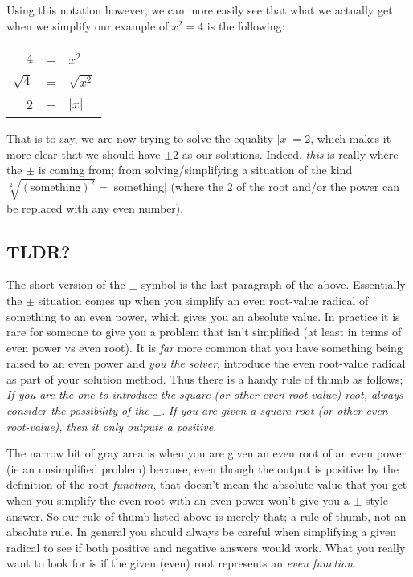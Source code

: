 \documentclass{ximera}
\begin{document}
Using this notation however, we can more easily see that what we actually get when we simplify our example of $x^2 = 4$ is the following:\\
\begin{center}
    \begin{tabular}{rcl}
        $4$         & = & $x^2$         \\
        $\sqrt{4}$  & = & $\sqrt{x^2}$  \\
        $2$         & = & $|x|$
    \end{tabular}
\end{center}
That is to say, we are now trying to solve the equality $|x| = 2$, which makes it more clear that we should have $\pm 2$ as our solutions. Indeed, \textit{this} is really where the $\pm$ is coming from; from solving/simplifying a situation of the kind $\sqrt[2]{(\text{something})^2}=|$something$|$ (where the $2$ of the root and/or the power can be replaced with any even number).

\subsection*{TLDR?}

    The short version of the $\pm$ symbol is the last paragraph of the above. Essentially the $\pm$ situation comes up when you simplify an even root-value radical of something to an even power, which gives you an absolute value. In practice it is rare for someone to give you a problem that isn't simplified (at least in terms of even power vs even root). It is \textit{far} more common that you have something being raised to an even power and \textit{you the solver}, introduce the even root-value radical as part of your solution method. Thus there is a handy rule of thumb as follows; \textit{If you are the one to introduce the square (or other even root-value) root, always consider the possibility of the }$\pm$. \textit{If you are given a square root (or other even root-value), then it only outputs a positive.}

    The narrow bit of gray area is when you are given an even root of an even power (ie an unsimplified problem) because, even though the output is positive by the definition of the root \textit{function}, that doesn't mean the absolute value that you get when you simplify the even root with an even power won't give you a $\pm$ style answer. So our rule of thumb listed above is merely that; a rule of thumb, not an absolute rule. In general you should always be careful when simplifying a given radical to see if both positive and negative answers would work. What you really want to look for is if the given (even) root represents an \textit{even function}.%
        
\end{document}
